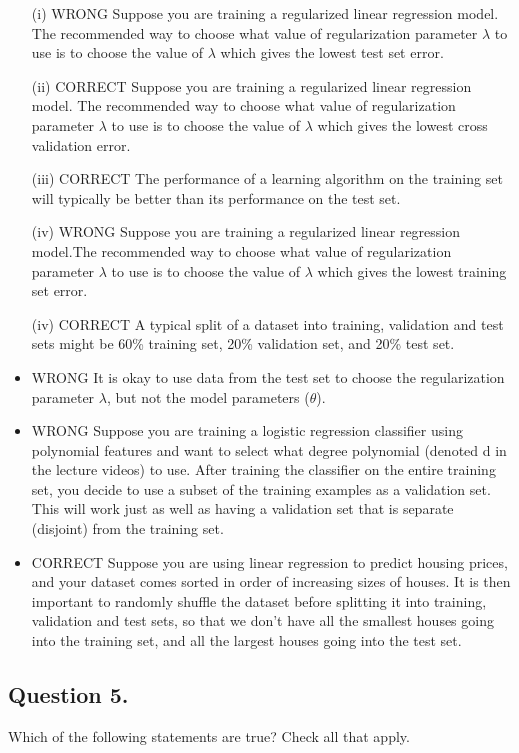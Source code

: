 \documentclass[11pt]{article} %
\begin{document}
\begin{itemize}
	\item[(i)]
WRONG Suppose you are training a regularized linear regression model. The recommended way to choose what value of regularization parameter $\lambda$ to use is to choose the value of $\lambda$ which gives the lowest test set error.
	\item[(ii)]
CORRECT Suppose you are training a regularized linear regression model. The recommended way to choose what value of regularization parameter $\lambda$ to use is to choose the value of $\lambda$ which gives the lowest cross validation error.
	\item[(iii)]
CORRECT The performance of a learning algorithm on the training set will typically be better than its performance on the test set.
	\item[(iv)]
WRONG Suppose you are training a regularized linear regression model.The recommended way to choose what value of regularization parameter $\lambda$ to use is to choose the value of $\lambda$ which gives the lowest training set error.
\item[(iv)] CORRECT A typical split of a dataset into training, validation and test sets might be 60\% training set, 20\% validation set, and 20\% test set.
\item WRONG It is okay to use data from the test set to choose the regularization parameter $\lambda$, but not the model parameters ($\theta$).
\item WRONG Suppose you are training a logistic regression classifier using polynomial features and want to select what degree polynomial (denoted d in the lecture videos) to use. After training the classifier on the entire training set, you decide to use a subset of the training examples as a validation set. This will work just as well as having a validation set that is separate (disjoint) from the training set.

\item CORRECT Suppose you are using linear regression to predict housing prices, and your dataset comes sorted in order of increasing sizes of houses. It is then important to randomly shuffle the dataset before splitting it into training, validation and test sets, so that we don’t have all the smallest houses going into the training set, and all the largest houses going into the test set.
\end{itemize}

\subsection*{Question 5. }
Which of the following statements are true? Check all that apply.
\end{document}
